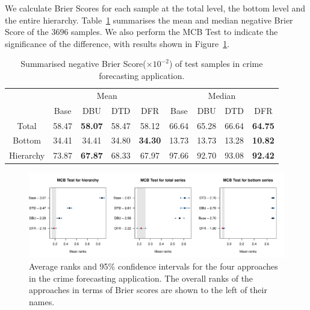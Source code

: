 \documentclass[a4paper,review,12pt,authoryear]{elsarticle}
\begin{document}
     We calculate Brier Scores for each sample at the total level, the bottom level and the entire hierarchy. 
     Table~\ref{tab:crime_bs} summarises the mean and median negative Brier Score of the $3696$ samples.
     We also perform the MCB Test to indicate the significance of the difference, with results shown in Figure~\ref{fig:application_crime}.
     
     \begin{table}[h]
       \centering
       \caption{\label{tab:crime_bs}Summarised negative Brier Score($\times 10^{-2}$) of test samples in crime forecasting application.}
       \begin{tabular}{ccccccccc}
       \toprule
       &\multicolumn{4}{c}{Mean} 
       & \multicolumn{4}{c}{Median} \\ \cmidrule(lr){2-5} \cmidrule(lr){6-9}
        & Base & DBU & DTD & DFR &  Base & DBU & DTD & DFR \\\midrule
       Total & 58.47 & \textbf{58.07} & 58.47 & 58.12 & 66.64 & 65.28 & 66.64 & \textbf{64.75} \\
       Bottom & 34.41 & 34.41 & 34.80 & \textbf{34.30} & 13.73 & 13.73 & 13.28 & \textbf{10.82}\\
       Hierarchy & 73.87 & \textbf{67.87} & 68.33 & 67.97 & 97.66 & 92.70 & 93.08 & \textbf{92.42}\\
       \bottomrule
       \end{tabular}
       \end{table}
     
     \begin{figure}[h]
       \caption{\label{fig:application_crime}Average ranks and 95\% confidence intervals for the four approaches in the crime forecasting application. The overall ranks of the approaches in terms of Brier scores are shown to the left of their names.}
       \centering
       \includegraphics[width=\textwidth]{figures/dc_crime_mcb.pdf}
     \end{figure}
     
\end{document}
